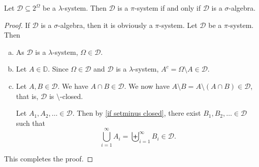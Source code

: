 \begin{theorem}
\label{cap closed lam sys}
    Let $\mathcal{D}\subseteq2^\Omega$ be a $\lambda$-system. Then $\mathcal{D}$ is a $\pi$-system if and only if $\mathcal{D}$ is a $\sigma$-algebra.
\end{theorem}
\begin{proof}
    If $\mathcal{D}$ is a $\sigma$-algebra, then it is obviously a $\pi$-system. Let $\mathcal{D}$ be a $\pi$-system. Then
    \begin{enumerate}[(a)]
        \item As $\mathcal{D}$ is a $\lambda$-system, $\Omega\in\mathcal{D}$.
        \item Let $A\in\mathbb{D}$. Since $\Omega\in\mathcal{D}$ and $\mathcal{D}$ is a $\lambda$-system, $A^c=\Omega\setminus A\in\mathcal{D}$.
        \item Let $A,B\in\mathcal{D}$. We have $A\cap B\in\mathcal{D}$. We now have $A\setminus B = A\setminus (A\cap B)\in\mathcal{D}$, that is, $\mathcal{D}$ is $\setminus$-closed.
        
        Let $A_1,A_2,\ldots\in\mathcal{D}$. Then by \cref{if setminus closed}, there exist $B_1,B_2,\ldots\in\mathcal{D}$ such that
        $$\bigcup_{i=1}^\infty A_i=\biguplus_{i=1}^\infty B_i\in\mathcal{D}.$$
    \end{enumerate}
    This completes the proof.
\end{proof}

